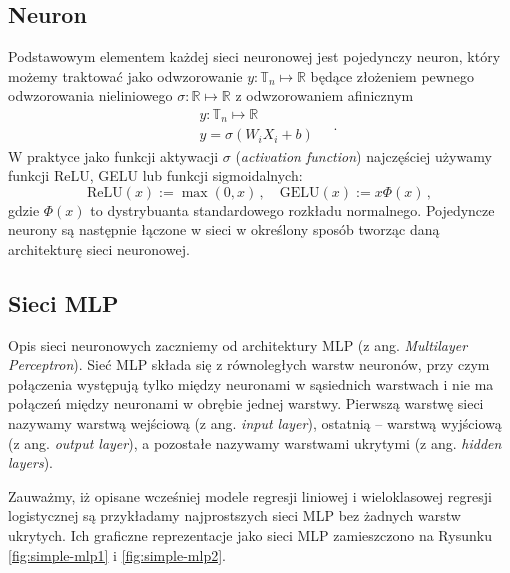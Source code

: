 \documentclass{myclass}
\begin{document}
\subsection{Neuron}

Podstawowym elementem każdej sieci neuronowej jest pojedynczy neuron, który możemy traktować jako
odwzorowanie \(y: \mathbb{T}_n \mapsto \mathbb{R}\) będące złożeniem pewnego odwzorowania
nieliniowego \(\sigma:\mathbb{R} \mapsto \mathbb{R}\) z odwzorowaniem afinicznym
\begin{equation*}
    \begin{split}
        &y: \mathbb{T}_n \mapsto \mathbb{R}\\
        &y = \sigma\left(W_i X_i + b\right)
    \end{split}\quad.
\end{equation*}
W praktyce jako funkcji aktywacji \(\sigma\) (\textit{activation function}) najczęściej używamy
funkcji ReLU, GELU lub funkcji sigmoidalnych:
\begin{equation*}
    \text{ReLU}(x) := \max(0, x)\,,\quad \text{GELU}(x) := x\Phi(x)\,,
\end{equation*}
gdzie \(\Phi(x)\) to dystrybuanta standardowego rozkładu normalnego. Pojedyncze neurony są następnie
łączone w sieci w określony sposób tworząc daną architekturę sieci neuronowej.

\subsection{Sieci MLP}

Opis sieci neuronowych zaczniemy od architektury MLP (z ang. \textit{Multilayer Perceptron}). Sieć
MLP składa się z równoległych warstw neuronów, przy czym połączenia występują tylko między neuronami
w sąsiednich warstwach i nie ma połączeń między neuronami w obrębie jednej warstwy. Pierwszą warstwę
sieci nazywamy warstwą wejściową (z ang. \textit{input layer}), ostatnią -- warstwą wyjściową (z
ang. \textit{output layer}), a pozostałe nazywamy warstwami ukrytymi (z ang. \textit{hidden
layers}).

Zauważmy, iż opisane wcześniej modele regresji liniowej i wieloklasowej regresji logistycznej są
przykładamy najprostszych sieci MLP bez żadnych warstw ukrytych. Ich graficzne reprezentacje jako
sieci MLP zamieszczono na Rysunku \ref{fig:simple-mlp1} i \ref{fig:simple-mlp2}. 
\end{document}
